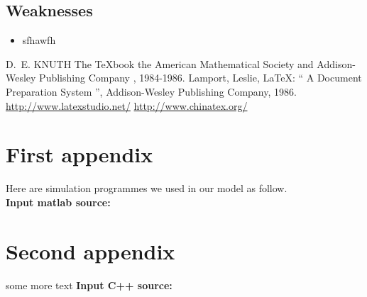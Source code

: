 \documentclass{mcmthesis}
\begin{document}
\subsection{Weaknesses}
\begin{itemize}
\item




sfhawfh
\end{itemize}

\begin{thebibliography}{99}
 D.~E. KNUTH   The \TeX{}book  the American
Mathematical Society and Addison-Wesley
Publishing Company , 1984-1986.
Lamport, Leslie,  \LaTeX{}: `` A Document Preparation System '',
Addison-Wesley Publishing Company, 1986.
\url{http://www.latexstudio.net/}
\url{http://www.chinatex.org/}
\end{thebibliography}

\begin{appendices}

\section{First appendix}

\lipsum[13]

Here are simulation programmes we used in our model as follow.\\

\textbf{\textcolor[rgb]{0.98,0.00,0.00}{Input matlab source:}}


\section{Second appendix}

some more text \textcolor[rgb]{0.98,0.00,0.00}{\textbf{Input C++ source:}}



\end{appendices}
\end{document}

